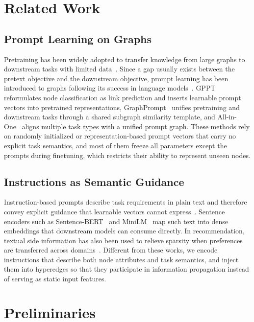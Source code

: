 \section{Related Work}
\subsection{Prompt Learning on Graphs}
Pretraining has been widely adopted to transfer knowledge from large graphs to downstream tasks with limited data~\cite{gptgnn, gcc, graphmae}. Since a gap usually exists between the pretext objective and the downstream objective, prompt learning has been introduced to graphs following its success in language models~\cite{promptsurveynlp, gpt3}. GPPT~\cite{gppt} reformulates node classification as link prediction and inserts learnable prompt vectors into pretrained representations, GraphPrompt~\cite{graphprompt} unifies pretraining and downstream tasks through a shared subgraph similarity template, and All-in-One~\cite{allinone} aligns multiple task types with a unified prompt graph. These methods rely on randomly initialized or representation-based prompt vectors that carry no explicit task semantics, and most of them freeze all parameters except the prompts during finetuning, which restricts their ability to represent unseen nodes.

\subsection{Instructions as Semantic Guidance}
Instruction-based prompts describe task requirements in plain text and therefore convey explicit guidance that learnable vectors cannot express~\cite{instructor, graphgpt}. Sentence encoders such as Sentence-BERT~\cite{sentenceBERT} and MiniLM~\cite{minilm} map such text into dense embeddings that downstream models can consume directly. In recommendation, textual side information has also been used to relieve sparsity when preferences are transferred across domains~\cite{WangFGCH19}. Different from these works, we encode instructions that describe both node attributes and task semantics, and inject them into hyperedges so that they participate in information propagation instead of serving as static input features.

\section{Preliminaries}
